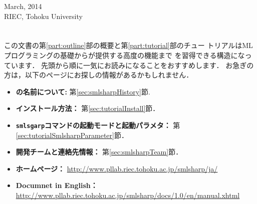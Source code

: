 \begin{flushright}
{
March, 2014\\
RIEC, Tohoku University\\
\authors
}
\end{flushright}

\chapter{}

\ifjp%
    この文書の第\ref{part:outline}部の概要と第\ref{part:tutorial}部のチュー
トリアルはMLプログラミングの基礎から\smlsharp{}が提供する高度の機能まで
を習得できる構造になっています．
	先頭から順に一気にお読みになることをおすすめします．
	お急ぎの方は，以下のページにお探しの情報があるかもしれません．
\begin{itemize}
\item {\bf \smlsharp{}の名前について:}
第\ref{sec:smlsharpHistory}節.
\item {\bf インストール方法：}
第\ref{sec:tutorialInstall}節．
\item {\bf {\tt smlsgarp}コマンドの起動モードと起動パラメタ：}
第\ref{sec:tutorialSmlsharpParameter}節．
\item {\bf \smlsharp{}開発チームと連絡先情報：} 第\ref{sec:smlsharpTeam}節．
\item {\bf \smlsharp{}ホームページ：}
\url{http://www.pllab.riec.tohoku.ac.jp/smlsharp/ja/}
\item {\bf \smlsharp{} Documnet in English：}
\url{http://www.pllab.riec.tohoku.ac.jp/smlsharp/docs/1.0/en/manual.xhtml}
\end{itemize}   

